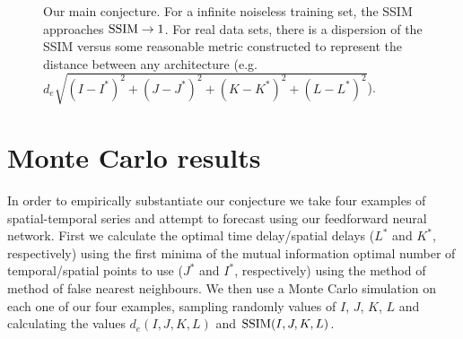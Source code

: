 \documentclass[journal]{IEEEtran}
\begin{document}
\begin{figure}
\caption{Our main conjecture. For a infinite noiseless training set, the SSIM approaches $\textnormal{SSIM} \to 1$. For real data sets,
there is a dispersion of the SSIM versus some reasonable metric constructed to
 represent the distance between any architecture (e.g.\ $d_e\sqrt{(I-I^*)^2+(J-J^*)^2+(K-K^*)^2+(L-L^*)^2}$).
}
\label{conjecture}
\end{figure}





\section{Monte Carlo results}

In order to empirically substantiate our conjecture we take four examples of spatial-temporal series and attempt
to forecast using our feedforward neural network. First we calculate the optimal time delay/spatial delays ($L^*$ and $K^*$, respectively)
using the first minima of the  mutual information optimal number of temporal/spatial points to use
($J^*$ and $I^*$, respectively) using the  method of method of false nearest neighbours.
We then use a Monte Carlo simulation on each one of our four examples, sampling randomly values
of $I$, $J$, $K$, $L$ and calculating the values $d_e(I,J,K,L)$ and $\textnormal{SSIM}(I,J,K,L)$.
\end{document}
